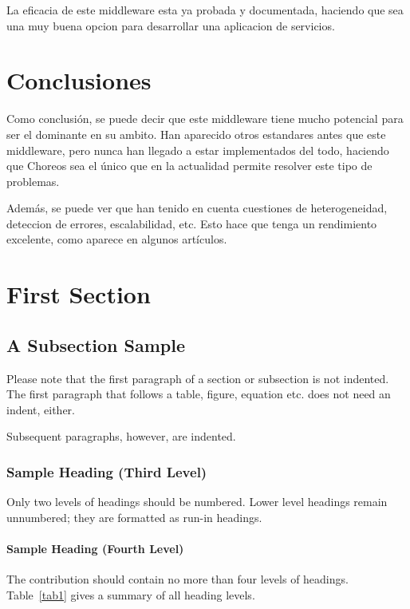 \documentclass[runningheads]{llncs}
\begin{document}
La eficacia de este middleware esta ya probada y documentada, haciendo que sea una muy buena opcion para desarrollar una aplicacion de servicios.

\section{Conclusiones}
Como conclusión, se puede decir que este middleware tiene mucho potencial para ser el dominante en su ambito. Han aparecido otros estandares antes que este middleware, pero nunca han llegado a estar implementados del todo, haciendo que Choreos sea el único que en la actualidad permite resolver este tipo de problemas.

Además, se puede ver que han tenido en cuenta cuestiones de heterogeneidad, deteccion de errores, escalabilidad, etc. Esto hace que tenga un rendimiento excelente, como aparece en algunos artículos.
\section{First Section}
\subsection{A Subsection Sample}
Please note that the first paragraph of a section or subsection is
not indented. The first paragraph that follows a table, figure,
equation etc. does not need an indent, either.

Subsequent paragraphs, however, are indented.

\subsubsection{Sample Heading (Third Level)} Only two levels of
headings should be numbered. Lower level headings remain unnumbered;
they are formatted as run-in headings.

\paragraph{Sample Heading (Fourth Level)}
The contribution should contain no more than four levels of
headings. Table~\ref{tab1} gives a summary of all heading levels.
\end{document}
